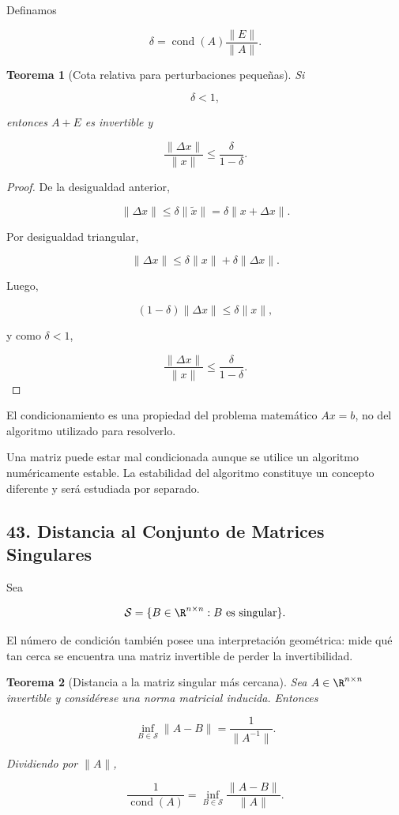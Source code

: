 \documentclass[12pt]{article}
\DeclareMathOperator{\cond}{cond}
\newtheorem{teorema}{Teorema}
\begin{document}
Definamos

\[
    \delta
    =
    \cond(A)\frac{\|E\|}{\|A\|}.
\]

\begin{teorema}[Cota relativa para perturbaciones pequeñas]
Si

\[
    \delta<1,
\]

entonces $A+E$ es invertible y

\[
    \boxed{
    \frac{\|\Delta x\|}{\|x\|}
    \leq
    \frac{\delta}{1-\delta}.
    }
\]
\end{teorema}

\begin{proof}
De la desigualdad anterior,

\[
    \|\Delta x\|
    \leq
    \delta\|\widetilde{x}\|
    =
    \delta\|x+\Delta x\|.
\]

Por desigualdad triangular,

\[
    \|\Delta x\|
    \leq
    \delta\|x\|
    +
    \delta\|\Delta x\|.
\]

Luego,

\[
    (1-\delta)\|\Delta x\|
    \leq
    \delta\|x\|,
\]

y como $\delta<1$,

\[
    \frac{\|\Delta x\|}{\|x\|}
    \leq
    \frac{\delta}{1-\delta}.
\]
\end{proof}


\begin{observacion}
El condicionamiento es una propiedad del problema matemático
$Ax=b$, no del algoritmo utilizado para resolverlo.

Una matriz puede estar mal condicionada aunque se utilice un algoritmo
numéricamente estable. La estabilidad del algoritmo constituye un
concepto diferente y será estudiada por separado.
\end{observacion}


\subsection*{43. Distancia al Conjunto de Matrices Singulares}

Sea

\[
    \mathcal{S}
    =
    \{B\in\R^{n\times n}: B\text{ es singular}\}.
\]

El número de condición también posee una interpretación geométrica:
mide qué tan cerca se encuentra una matriz invertible de perder la
invertibilidad.

\begin{teorema}[Distancia a la matriz singular más cercana]
Sea $A\in\R^{n\times n}$ invertible y considérese una norma matricial
inducida. Entonces

\[
    \boxed{
    \inf_{B\in\mathcal{S}}
    \|A-B\|
    =
    \frac{1}{\|A^{-1}\|}.
    }
\]

Dividiendo por $\|A\|$,

\[
    \boxed{
    \frac{1}{\cond(A)}
    =
    \inf_{B\in\mathcal{S}}
    \frac{\|A-B\|}{\|A\|}.
    }
\]
\end{teorema}
\end{document}

